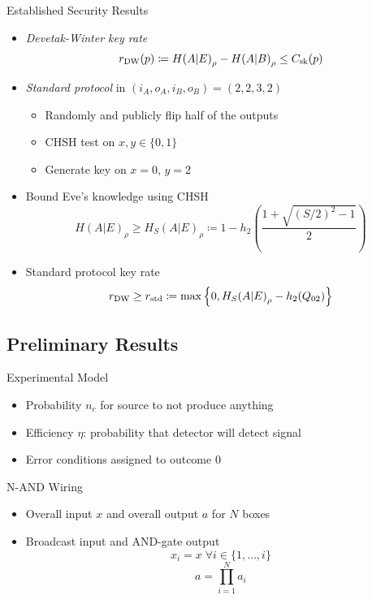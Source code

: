 \documentclass[xcolor=dvipsnames]{beamer}
\newcommand{\dintv}[2]{\mathopen\{#1,\ldots,#2\mathclose\}}
\newcommand{\?}{\mathrel{?}} %
\newcommand{\sk}{\rm sk}
\newcommand{\DW}{\rm DW}
\newcommand{\std}{\rm std}
\begin{document}
\begin{frame}{Established Security Results}
    \begin{itemize}[<+->]
    \item \emph{Devetak-Winter key rate}
      \[ r_{\DW}(p) \coloneqq {H(A|E)}_{\rho} - {H(A|B)}_{\rho} \leq C_{\sk}(p) \]
    \item \emph{Standard protocol} in \((i_A, o_A, i_B, o_B) = (2,2,3,2)\)
      \begin{itemize}
        \item Randomly and publicly flip half of the outputs
        \item CHSH test on \(x, y \in \{0,1\}\)
        \item Generate key on \(x=0\), \(y=2\)
      \end{itemize}
    \item Bound Eve's knowledge using CHSH
      \[ {H(A|E)}_{\rho} \geq {H_S(A|E)}_{\rho} \coloneqq 1 - h_2\left( \frac{1 + \sqrt{{(S/2)}^2-1}}{2} \right) \]
    \item Standard protocol key rate
      \[ r_{\DW} \geq r_{\std} \coloneqq \max \left\{ 0, {H_S(A|E)}_{\rho} - h_2(Q_{02}) \right\} \]
    \end{itemize}
\end{frame}

\subsection{Preliminary Results}

\begin{frame}{Experimental Model}
  \begin{itemize}[<+->]
    \item Probability \(n_c\) for source to not produce anything
    \item Efficiency \(\eta\): probability that detector will detect signal
    \item Error conditions assigned to outcome \(0\)
  \end{itemize}
\end{frame}

\begin{frame}{N-AND Wiring}
  \begin{itemize}[<+->]
    \item Overall input \(x\) and overall output \(a\) for \(N\) boxes
    \item Broadcast input and AND-gate output
      \[ x_i = x\;\forall i \in \dintv{1}{i} \]
      \[ a = \prod_{i=1}^N a_i \]
  \end{itemize}
\end{frame}
\end{document}
